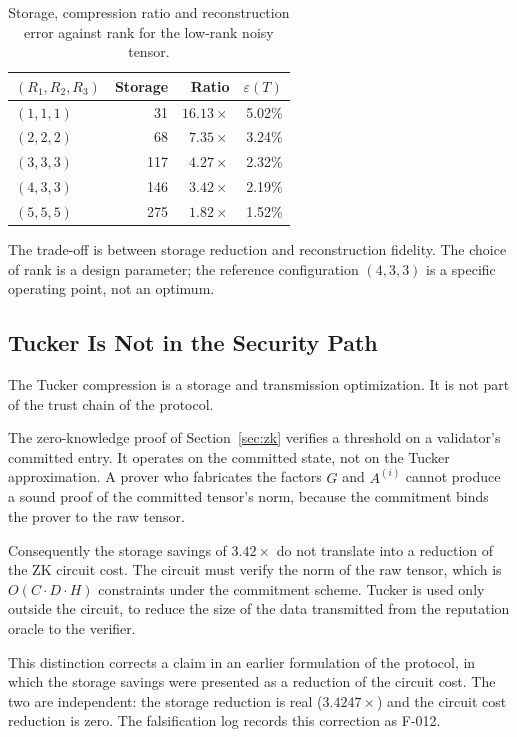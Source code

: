 \documentclass[11pt,a4paper]{article}
\numberwithin{equation}{section}
\numberwithin{table}{section}
\begin{document}
\begin{table}[H]
\centering
\caption{Storage, compression ratio and reconstruction error against rank for the low-rank noisy tensor.}
\label{tab:tensor-rank}
\small
\begin{tabular}{lrrr}
\toprule
$(R_1, R_2, R_3)$ & Storage & Ratio & $\varepsilon(T)$ \\
\midrule
$(1,1,1)$ & 31 & $16.13\times$ & 5.02\% \\
$(2,2,2)$ & 68 & $7.35\times$ & 3.24\% \\
$(3,3,3)$ & 117 & $4.27\times$ & 2.32\% \\
$(4,3,3)$ & 146 & $3.42\times$ & 2.19\% \\
$(5,5,5)$ & 275 & $1.82\times$ & 1.52\% \\
\bottomrule
\end{tabular}
\end{table}

The trade-off is between storage reduction and reconstruction fidelity. The choice of rank is a design parameter; the reference configuration $(4,3,3)$ is a specific operating point, not an optimum.

\subsection{Tucker Is Not in the Security Path}
The Tucker compression is a storage and transmission optimization. It is not part of the trust chain of the protocol.

The zero-knowledge proof of Section~\ref{sec:zk} verifies a threshold on a validator's committed entry. It operates on the committed state, not on the Tucker approximation. A prover who fabricates the factors $G$ and $A^{(i)}$ cannot produce a sound proof of the committed tensor's norm, because the commitment binds the prover to the raw tensor.

Consequently the storage savings of $3.42\times$ do not translate into a reduction of the ZK circuit cost. The circuit must verify the norm of the raw tensor, which is $O(C \cdot D \cdot H)$ constraints under the commitment scheme. Tucker is used only outside the circuit, to reduce the size of the data transmitted from the reputation oracle to the verifier.

This distinction corrects a claim in an earlier formulation of the protocol, in which the storage savings were presented as a reduction of the circuit cost. The two are independent: the storage reduction is real ($3.4247\times$) and the circuit cost reduction is zero. The falsification log records this correction as F-012.
\end{document}
